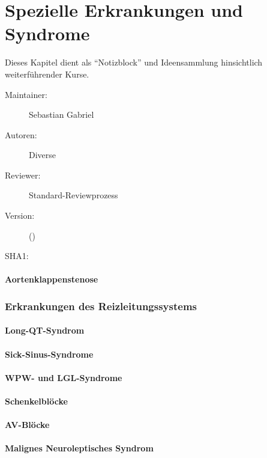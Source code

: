 \def\ChapterCode{SPE}
\chapter
[\CO{[SPE]} Spezielle Erkrankungen und Syndrome]
{Spezielle Erkrankungen und Syndrome}
\label{chp:SPE}



\ChapterIntro
{%
\SectionUnderDevelopment

Dieses Kapitel dient als \enquote{Notizblock} und Ideensammlung hinsichtlich
weiterführender Kurse.
}
{%
\begin{description}
  \item[Maintainer:] Sebastian Gabriel
  \item[Autoren:] Diverse
  \item[Reviewer:] Standard-Reviewprozess
  \item[Version:] {\DocVersion} ({\DocVersionInfo})
  \item[SHA1:] {\DocGitCommit}
\end{description}

{\TxTeilkapitelAASS}
}




\subsubsection{Aortenklappenstenose}

\subsection{Erkrankungen des Reizleitungssystems}

\subsubsection{Long-QT-Syndrom}

\subsubsection{Sick-Sinus-Syndrome} 

\subsubsection{WPW- und LGL-Syndrome}

\subsubsection{Schenkelblöcke}

\subsubsection{AV-Blöcke}


\subsubsection{Malignes Neuroleptisches Syndrom}

\ChapterEnd